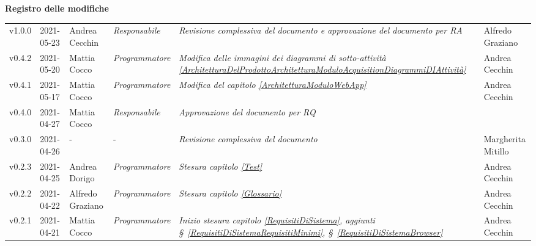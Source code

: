 \quad
\begin{center}
	\LARGE\textbf{Registro delle modifiche}
\end{center}
\def\tabularxcolumn#1{m{#1}}
{

\begin{center}
	\renewcommand{\arraystretch}{1.4}
	\begin{longtable}[c]{|p{2cm-1\tabcolsep}|p{2cm}|p{3cm-2\tabcolsep}|p{3cm-1.5\tabcolsep}|p{}|p{4cm-2\tabcolsep}|}
		\hline
		\rowcolor{airforceblue}
		\makecell[c]{\textbf{Versione}} & \makecell[c]{\textbf{Data}} & \makecell[c]{\textbf{Autore}} & \makecell[c]{\textbf{Ruolo}} & \makecell[c]{\textbf{Modifica}} &  \makecell[c]{\textbf{Verificatore}}\\
		\hline
		\centering v1.0.0 & 2021-05-23 & Andrea Cecchin & \centering \textit{Responsabile} & \textit{Revisione complessiva del documento e approvazione del documento per RA} & Alfredo Graziano\\
		\hline
		\hline
		\centering v0.4.2 & 2021-05-20 & Mattia Cocco & \centering \textit{Programmatore} & \textit{Modifica delle immagini dei diagrammi di sotto-attività \ref{ArchitetturaDelProdottoArchitetturaModuloAcquisitionDiagrammiDIAttività}} & Andrea Cecchin\\
		\hline
		\hline
		\centering v0.4.1 & 2021-05-17 & Mattia Cocco & \centering \textit{Programmatore} & \textit{Modifica del capitolo \ref{ArchitetturaModuloWebApp}} & Andrea Cecchin\\
		\hline
		\centering v0.4.0 & 2021-04-27 & Mattia Cocco & \centering \textit{Responsabile} & \textit{Approvazione del documento per RQ}  & \makecell[c]{-}\\
		\hline
		\hline
		\centering v0.3.0 & 2021-04-26 &\centering - &\centering - & \textit{Revisione complessiva del documento} & Margherita Mitillo\\
		\hline
		\hline
		\centering v0.2.3 & 2021-04-25 & Andrea Dorigo & \centering \textit{Programmatore} & \textit{Stesura capitolo \ref{Test}} & Andrea Cecchin\\
		\hline
		\hline
		\centering v0.2.2 & 2021-04-22 & Alfredo Graziano & \centering \textit{Programmatore} & \textit{Stesura capitolo \ref{Glossario}} & Andrea Cecchin\\
		\hline
		\hline
		\centering v0.2.1 & 2021-04-21 & Mattia Cocco & \centering \textit{Programmatore} & \textit{Inizio stesura capitolo \ref{RequisitiDiSistema}, aggiunti \S~\ref{RequisitiDiSistemaRequisitiMinimi}, \S~\ref{RequisitiDiSistemaBrowser}} & Andrea Cecchin\\

\end{longtable}
\end{center}}
